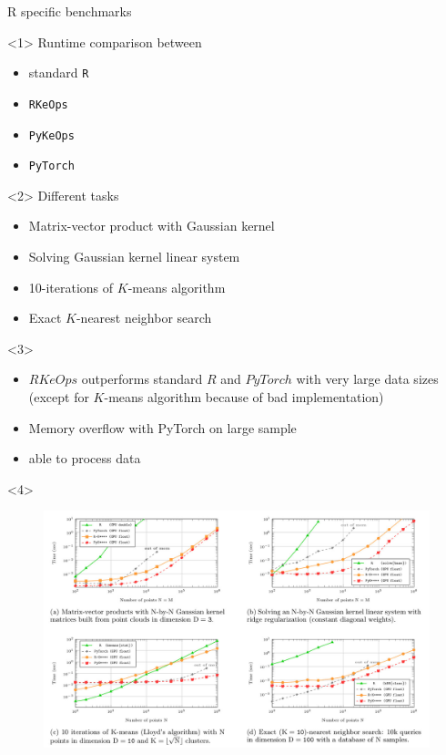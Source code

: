 \documentclass[12pt,aspectratio=1610]{beamer}
\begin{document}
\begin{frame}{R specific benchmarks}

\begin{onlyenv}<1>
Runtime comparison between 
\begin{itemize}
\setitsep{1em}
\item standard \texttt{R}
\item \texttt{RKeOps}
\item \texttt{PyKeOps}
\item \texttt{PyTorch}
\end{itemize}
\end{onlyenv}

\begin{onlyenv}<2>
Different tasks

\begin{itemize}
\small
\setitsep{1em}
\item Matrix-vector product with Gaussian kernel
\item Solving Gaussian kernel linear system
\item 10-iterations of $K$-means algorithm
\item Exact $K$-nearest neighbor search
\end{itemize}
\end{onlyenv}

\begin{onlyenv}<3>
\begin{itemize}
\setitsep{1em}
\item $RKeOps$ outperforms standard $R$ and $PyTorch$ with very large data sizes\\
{\footnotesize (except for $K$-means algorithm because of bad implementation)}
\item Memory overflow with PyTorch on large sample
\item {} able to process data 
\end{itemize}

\end{onlyenv}

\begin{onlyenv}<4>
\begin{figure}
\centering
\includegraphics[width=0.9\linewidth]{./images/benchmark2.jpg}
\end{figure}
\end{onlyenv}
\end{frame}
\end{document}
